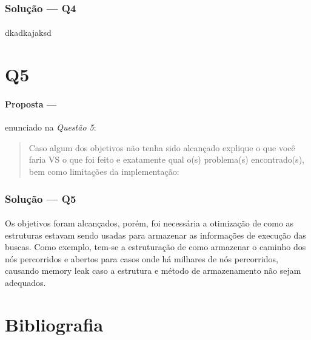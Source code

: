 \documentclass[12pt]{article}
\begin{document}
\subsubsection{Solução --- \textbf{Q4}}

\paragraph{}
dkadkajaksd

\section{Q5}

\paragraph{Proposta ---} enunciado na \textit{Questão 5}:

\begin{quote}
Caso algum dos objetivos não tenha sido alcançado explique o que você faria VS o que foi feito e exatamente qual o(s)
  problema(s) encontrado(s), bem como  limitações da implementação:
\end{quote}

\subsubsection{Solução --- \textbf{Q5}}

\paragraph{}
Os objetivos foram alcançados, porém, foi necessária a otimização de como as estruturas estavam sendo usadas para armazenar as informações de execução das buscas. Como exemplo, tem-se a estruturação de como armazenar o caminho dos nós percorridos e abertos para casos onde há milhares de nós percorridos, causando memory leak caso a estrutura e método de armazenamento não sejam adequados.

\newpage
\section{Bibliografia}


\end{document}

